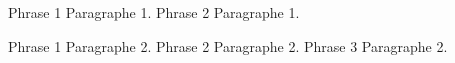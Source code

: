 \documentclass{article}
\begin{document}
	
	Phrase 1 Paragraphe 1. 
	Phrase 2 Paragraphe 1. 
	
	Phrase 1 Paragraphe 2. 
	Phrase 2 Paragraphe 2.	
	\newline	
	Phrase 3 Paragraphe 2.
\end{document}
